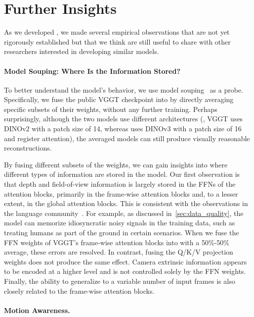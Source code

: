 \section{Further Insights}%
\label{sec:discussion}




As we developed \method, we made several empirical observations that are not yet rigorously established but that we think are still useful to share with other researchers interested in developing similar models.

\paragraph{Model Souping: Where Is the Information Stored?}

To better understand the model's behavior, we use model souping~\cite{wortsman22model} as a probe.
Specifically, we fuse the public VGGT checkpoint into \method by directly averaging specific subsets of their weights, without any further training.
Perhaps surprisingly, although the two models use different architectures (\eg, VGGT uses DINOv2 with a patch size of 14, whereas \method uses DINOv3 with a patch size of 16 and register attention), the averaged models can still produce visually reasonable reconstructions.

By fusing different subsets of the weights, we can gain insights into where different types of information are stored in the model.
Our first observation is that depth and field-of-view information is largely stored in the FFNs of the attention blocks, primarily in the frame-wise attention blocks and, to a lesser extent, in the global attention blocks.
This is consistent with the observations in the language community~\cite{geva21transformer,dai22knowledge,meng22locating}.
For example, as discussed in~\cref{sec:data_quality}, the model can memorize idiosyncratic noisy signals in the training data, such as treating humans as part of the ground in certain scenarios.
When we fuse the FFN weights of VGGT's frame-wise attention blocks into \method with a 50\%-50\% average, these errors are resolved.
In contrast, fusing the Q/K/V projection weights does not produce the same effect.
Camera extrinsic information appears to be encoded at a higher level and is not controlled solely by the FFN weights.
Finally, the ability to generalize to a variable number of input frames is also closely related to the frame-wise attention blocks.


\paragraph{Motion Awareness.}

